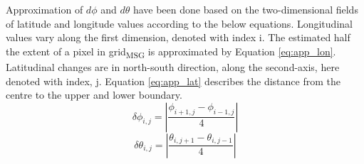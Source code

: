 Approximation of $d\phi$ and $d\theta$ have been done based on the two-dimensional fields of latitude and longitude values according to the below equations.
Longitudinal values vary along the first dimension, denoted with index i. The estimated half the extent of a pixel in grid\textsubscript{MSG} is approximated by Equation \eqref{eq:app_lon}. Latitudinal changes are in north-south direction, along the second-axis, here denoted with index, j. Equation \eqref{eq:app_lat} describes the distance from the centre to the upper and lower boundary.
\begin{equation} \label{eq:app_lon}
    \delta \phi_{i,j} = \left| \frac{\phi_{i+1,j} - \phi_{i-1, j}}{4} \right|
\end{equation}
\begin{equation} \label{eq:app_lat}
    \delta \theta_{i,j} = \left| \frac{\theta_{i,j+1} - \theta_{i, j-1}}{4} \right|
\end{equation}

